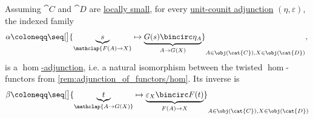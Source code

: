 \begin{proposition}\label{thm:unit_counit_adjunction_induces_hom_adjunction}
  Assuming \( \cat{C} \) and \( \cat{D} \) are \hyperref[def:small_category]{locally small}, for every \hyperref[def:unit_counit_adjunction]{unit-counit adjunction} \( (\eta, \varepsilon) \), the indexed family
  \begin{equation*}
    \alpha \coloneqq \seq[\big]{ \underbrace{s}_{\mathclap{F(A) \to X}} \mapsto \underbrace{G(s) \bincirc \eta_A}_{A \to G(X)} }_{A \in \obj(\cat{C}), X \in \obj(\cat{D})}, \\
  \end{equation*}
  is a \hyperref[def:hom_adjunction]{\( \hom \)-adjunction}, i.e. a natural isomorphism between the twisted \( \hom \)-functors from \cref{rem:adjunction_of_functors/hom}. Its inverse is
  \begin{equation*}
    \beta \coloneqq \seq[\big]{ \underbrace{t}_{\mathclap{A \to G(X)}} \mapsto \underbrace{\varepsilon_X \bincirc F(t)}_{F(A) \to X} }_{A \in \obj(\cat{C}), X \in \obj(\cat{D})}
  \end{equation*}
\end{proposition}
